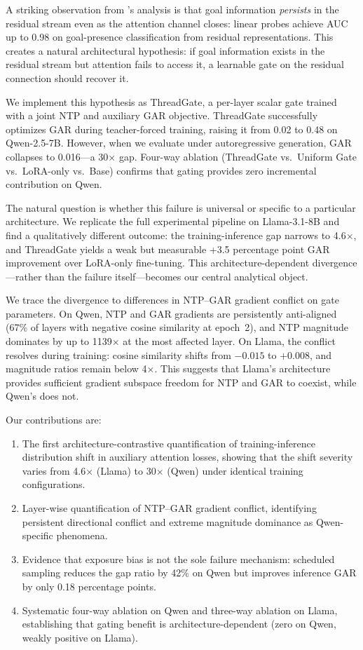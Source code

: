 \documentclass[11pt,a4paper]{article}
\begin{document}
A striking observation from \citeauthor{dongre2026multiturn}'s analysis is that goal information \emph{persists} in the residual stream even as the attention channel closes: linear probes achieve AUC up to 0.98 on goal-presence classification from residual representations.
This creates a natural architectural hypothesis: if goal information exists in the residual stream but attention fails to access it, a learnable gate on the residual connection should recover it.

We implement this hypothesis as ThreadGate, a per-layer scalar gate trained with a joint NTP and auxiliary GAR objective.
ThreadGate successfully optimizes GAR during teacher-forced training, raising it from 0.02 to 0.48 on Qwen-2.5-7B.
However, when we evaluate under autoregressive generation, GAR collapses to 0.016---a 30$\times$ gap.
Four-way ablation (ThreadGate vs.\ Uniform Gate vs.\ LoRA-only vs.\ Base) confirms that gating provides zero incremental contribution on Qwen.

The natural question is whether this failure is universal or specific to a particular architecture.
We replicate the full experimental pipeline on Llama-3.1-8B and find a qualitatively different outcome: the training-inference gap narrows to 4.6$\times$, and ThreadGate yields a weak but measurable +3.5 percentage point GAR improvement over LoRA-only fine-tuning.
This architecture-dependent divergence---rather than the failure itself---becomes our central analytical object.

We trace the divergence to differences in NTP--GAR gradient conflict on gate parameters.
On Qwen, NTP and GAR gradients are persistently anti-aligned (67\% of layers with negative cosine similarity at epoch~2), and NTP magnitude dominates by up to 1139$\times$ at the most affected layer.
On Llama, the conflict resolves during training: cosine similarity shifts from $-0.015$ to $+0.008$, and magnitude ratios remain below 4$\times$.
This suggests that Llama's architecture provides sufficient gradient subspace freedom for NTP and GAR to coexist, while Qwen's does not.

Our contributions are:
\begin{enumerate}
    \item The first architecture-contrastive quantification of training-inference distribution shift in auxiliary attention losses, showing that the shift severity varies from 4.6$\times$ (Llama) to 30$\times$ (Qwen) under identical training configurations.
    \item Layer-wise quantification of NTP--GAR gradient conflict, identifying persistent directional conflict and extreme magnitude dominance as Qwen-specific phenomena.
    \item Evidence that exposure bias is not the sole failure mechanism: scheduled sampling reduces the gap ratio by 42\% on Qwen but improves inference GAR by only 0.18 percentage points.
    \item Systematic four-way ablation on Qwen and three-way ablation on Llama, establishing that gating benefit is architecture-dependent (zero on Qwen, weakly positive on Llama).
\end{enumerate}
\end{document}
